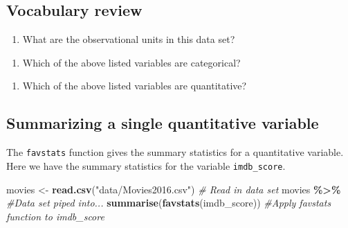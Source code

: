 \documentclass[
]{report}
\newenvironment{Shaded}{\begin{snugshade}}{\end{snugshade}}
\newcommand{\CommentTok}[1]{\textcolor[rgb]{0.56,0.35,0.01}{\textit{#1}}}
\newcommand{\KeywordTok}[1]{\textcolor[rgb]{0.13,0.29,0.53}{\textbf{#1}}}
\newcommand{\NormalTok}[1]{#1}
\newcommand{\OperatorTok}[1]{\textcolor[rgb]{0.81,0.36,0.00}{\textbf{#1}}}
\newcommand{\StringTok}[1]{\textcolor[rgb]{0.31,0.60,0.02}{#1}}
\providecommand{\tightlist}{%
  \setlength{\itemsep}{0pt}\setlength{\parskip}{0pt}}
\begin{document}
\newpage

\hypertarget{vocabulary-review}{%
\subsection*{Vocabulary review}\label{vocabulary-review}}

\begin{enumerate}
\def\labelenumi{\arabic{enumi}.}
\tightlist
\item
  What are the observational units in this data set?
\end{enumerate}

\vspace{0.3in}

\begin{enumerate}
\def\labelenumi{\arabic{enumi}.}
\setcounter{enumi}{1}
\tightlist
\item
  Which of the above listed variables are categorical?
\end{enumerate}

\vspace{.5in}

\begin{enumerate}
\def\labelenumi{\arabic{enumi}.}
\setcounter{enumi}{2}
\tightlist
\item
  Which of the above listed variables are quantitative?
\end{enumerate}

\vspace{.5in}

\hypertarget{summarizing-a-single-quantitative-variable}{%
\subsection*{Summarizing a single quantitative variable}\label{summarizing-a-single-quantitative-variable}}

The \texttt{favstats} function gives the summary statistics for a quantitative variable. Here we have the summary statistics for the variable \texttt{imdb\_score}.

\begin{Shaded}
\begin{Highlighting}[]
\NormalTok{movies \textless{}{-}}\StringTok{ }\KeywordTok{read.csv}\NormalTok{(}\StringTok{"data/Movies2016.csv"}\NormalTok{) }\CommentTok{\# Read in data set}
\NormalTok{movies }\OperatorTok{\%\textgreater{}\%}\StringTok{ }\CommentTok{\#Data set piped into...}
\StringTok{  }\KeywordTok{summarise}\NormalTok{(}\KeywordTok{favstats}\NormalTok{(imdb\_score)) }\CommentTok{\#Apply favstats function to imdb\_score}
\end{Highlighting}
\end{Shaded}
\end{document}
